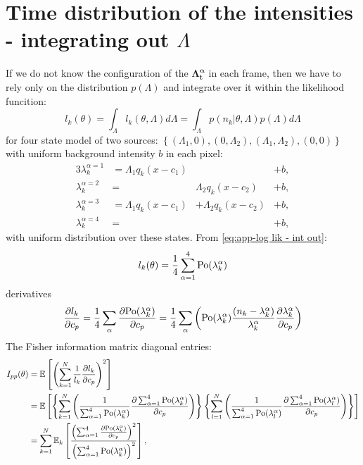 \section{Time distribution of the intensities - integrating out $\Lambda$}
\label{sub:Appendix Time-distribution-Integrating out}
If we do not know the configuration of the $\bm{\Lambda^\alpha_t}$ in each frame, then we have to rely only on the distribution $p(\Lambda)$ and integrate over it within the likelihood funcition:
%
\begin{equation}
	l_k(\theta)=\int_{\Lambda}l_k(\theta,\Lambda)d\Lambda=\int_{\Lambda}p(n_k|\theta,\Lambda)p(\Lambda)d\Lambda
	\label{eq:app-log lik - int out}
\end{equation}
%
for four state model of two sources: $\left\{ (\Lambda_1,0),(0,\Lambda_2),(\Lambda_1,\Lambda_2),(0,0)\right\}$ with uniform background intensity $b$ in each pixel: 
\begin{alignat}{3}
	\lambda_k^{\alpha=1}&=\Lambda_1q_k(x-c_1) & &+b,\nonumber\\ 
	\lambda_k^{\alpha=2}&=&\Lambda_2q_k(x-c_2) &+b,\nonumber\\ 
	\lambda_k^{\alpha=3}&=\Lambda_1q_k(x-c_1)&+\Lambda_2q_k(x-c_2)&+b,\nonumber\\ 
	\lambda_k^{\alpha=4}&=& &+b,
\end{alignat}
%
with uniform distribution over these states. From \autoref{eq:app-log lik - int out}:
%
\begin{equation}
	l_k(\theta)=\frac{1}{4}\sum_{\alpha=1}^4\mathrm{Po}(\lambda_k^\alpha)
\end{equation}
%
derivatives 
%
\begin{equation}
	\frac{\partial l_k}{\partial c_p}=\frac{1}{4}\sum_\alpha\frac{\partial\mathrm{Po}(\lambda_k^\alpha)}{\partial c_p}=\frac{1}{4}\sum_\alpha\left(\mathrm{Po}(\lambda_k^\alpha)\frac{(n_k-\lambda_k^\alpha)}{\lambda_k^\alpha}\frac{\partial\lambda_k^\alpha}{\partial c_p}\right)
\end{equation}
%
The Fisher information matrix diagonal entries:
%
\begin{alignat}{1}
	I_{pp}(\theta) & =\mathbb{E}\left[\left(\sum_{k=1}^N\frac{1}{l_k}\frac{\partial l_k}{\partial c_p}\right)^2\right]\nonumber \\
 	& =\mathbb{E}\left[\left\{ \sum_{k=1}^N\left(\frac{1}{\sum_{\alpha=1}^4\mathrm{Po}(\lambda_k^\alpha)}\frac{\partial\sum_{\alpha=1}^4\mathrm{Po}(\lambda_k^\alpha)}{\partial c_p}\right)\right\} \left\{ \sum_{l=1}^N\left(\frac{1}{\sum_{\alpha=1}^4\mathrm{Po}(\lambda_l^\alpha)}\frac{\partial\sum_{\alpha=1}^4\mathrm{Po}(\lambda_l^\alpha)}{\partial c_p}\right)\right\} \right]\nonumber \\
	& =\sum_{k=1}^N\mathbb{E}_k\left[\frac{\left(\sum_{\alpha=1}^4\frac{\partial\mathrm{Po}(\lambda_k^\alpha)}{\partial c_p}\right)^2}{\left(\sum_{\alpha=1}^4\mathrm{Po}(\lambda_k^\alpha)\right)^2}\right],
	\label{eq:app-Fisher Info Integrated Out - diagonal entries}
\end{alignat}
